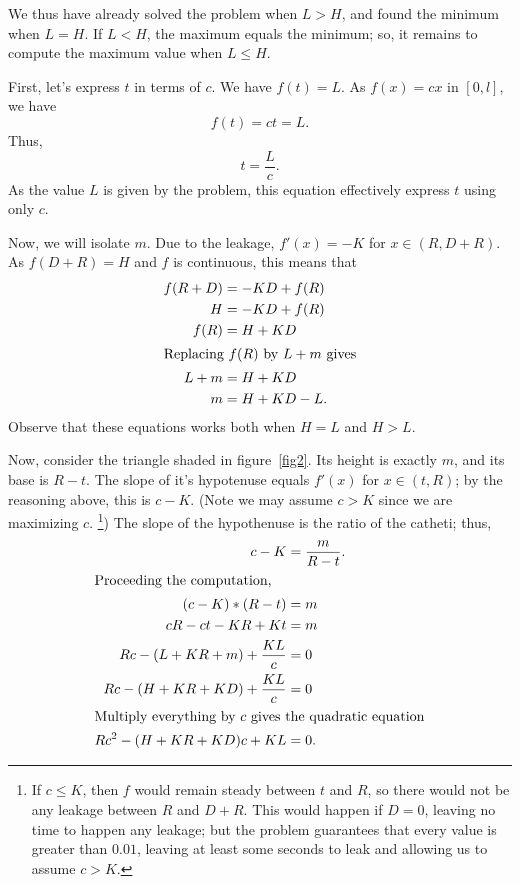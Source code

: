 \documentclass{article}
\begin{document}
We thus have already solved the problem when $L > H$,
and found the minimum when $L = H$.
If $L < H$, the maximum equals the minimum;
so, it remains to compute the maximum value when $L \leq H$.

First, let's express $t$ in terms of $c$.
We have $f(t) = L$.
As $f(x) = cx$ in $[0, l]$,
we have
\begin{equation*}
    f(t) = ct = L.
\end{equation*}
Thus,
\begin{equation*}
    t = \frac L c.
\end{equation*}
As the value $L$ is given by the problem,
this equation effectively express $t$ using only $c$.

Now, we will isolate $m$.
Due to the leakage, $f'(x) = -K$ for $x \in (R, D+R)$.
As $f(D+R) = H$ and $f$ is continuous,
this means that
\begin{align*}
    f(R+D) &= -KD + f(R) \\
    H &= -KD + f(R) \\
    f(R) &= H + KD \\
\intertext{Replacing $f(R)$ by $L + m$ gives}
    L + m &= H + KD \\
    m &= H + KD - L.
\end{align*}
Observe that these equations works both when $H = L$ and $H > L$.

Now, consider the triangle shaded in figure~\ref{fig2}.
Its height is exactly $m$,
and its base is $R - t$.
The slope of it's hypotenuse equals $f'(x)$ for $x \in (t, R)$;
by the reasoning above, this is $c - K$.
(Note we may assume $c > K$ since we are maximizing $c$.%
\footnote{
    If $c \leq K$, then $f$ would remain steady between $t$ and $R$,
    so there would not be any leakage between $R$ and $D+R$.
    This would happen if $D = 0$,
    leaving no time to happen any leakage;
    but the problem guarantees that every value is greater than $0.01$,
    leaving at least some seconds to leak
    and allowing us to assume $c > K$.
})
The slope of the hypothenuse is the ratio of the catheti;
thus,
\begin{align*}
    c - K &= \frac{m}{R - t}. \\
\intertext{Proceeding the computation,}
    (c - K)*(R - t) &= m \\
    cR - ct - KR + Kt &= m \\
    Rc - (L + KR + m) + \frac{KL}{c} &= 0 \\
    Rc - (H + KR + KD) + \frac{KL}{c} &= 0 \\
\intertext{Multiply everything by $c$ gives the quadratic equation}
    Rc^2 - (H + KR + KD)c + KL &= 0.
\end{align*}
\end{document}
